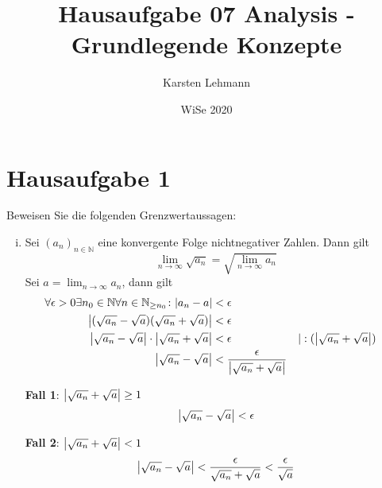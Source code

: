 \documentclass{article}
\author{Karsten Lehmann}
\date{WiSe 2020}
\title{Hausaufgabe 07 Analysis - Grundlegende Konzepte}
\begin{document}
\section*{Hausaufgabe 1}

Beweisen Sie die folgenden Grenzwertaussagen:

\begin{enumerate}[(i)]
\item Sei $(a_n)_{n \in \mathbb{N}}$ eine konvergente Folge nichtnegativer Zahlen. Dann gilt
  \[
    \lim_{n \to \infty} \sqrt{a_n} = \sqrt{\lim_{n \to \infty} a_n}
  \]
  Sei $a = \lim_{n \to \infty} a_n$, dann gilt
  \begin{align*}
    \forall \epsilon > 0 \exists n_0 \in \mathbb{N} \forall n \in \mathbb{N}_{\geq  n_0} \colon \abs{a_n - a} &< \epsilon  \\
    \abs{(\sqrt{a_n} - \sqrt{a})(\sqrt{a_n} + \sqrt{a})} &< \epsilon \\
    \abs{\sqrt{a_n} - \sqrt{a}} \cdot \abs{\sqrt{a_n} + \sqrt{a}} &< \epsilon && | : (\abs{\sqrt{a_n} + \sqrt{a}})\\
    \abs{\sqrt{a_n} - \sqrt{a}} &< \frac{\epsilon}{\abs{\sqrt{a_n} + \sqrt{a}}}
  \end{align*}
  \begin{minipage}[t]{.4\textwidth}
    \textbf{Fall 1}: $\abs{\sqrt{a_n} + \sqrt{a}} \geq 1$
    \[
        \abs{\sqrt{a_n} - \sqrt{a}} < \epsilon 
    \]
  \end{minipage}
  \hfill
  \vrule
  \hfill
  \begin{minipage}[t]{.4\textwidth}
    \textbf{Fall 2}: $\abs{\sqrt{a_n} + \sqrt{a}} < 1$
    \[
        \abs{\sqrt{a_n} - \sqrt{a}} < \frac{\epsilon}{\sqrt{a_n} + \sqrt{a}} < \frac{\epsilon}{\sqrt{a}} 
    \]
  \end{minipage}


\end{enumerate}
\end{document}
